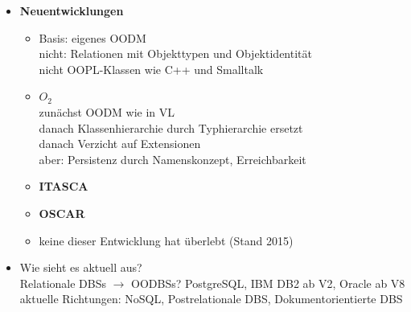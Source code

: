 \begin{itemize}
	\item \textbf{Neuentwicklungen}
	\begin{itemize}
		\item Basis: eigenes OODM\\
		nicht: Relationen mit Objekttypen und Objektidentität\\
		nicht OOPL-Klassen wie C++ und Smalltalk
		
		\item $O_2$\\
		zunächst OODM wie in VL\\
		danach Klassenhierarchie durch Typhierarchie ersetzt\\
		danach Verzicht auf Extensionen\\
		aber: Persistenz durch Namenskonzept, Erreichbarkeit
		
		\item \textbf{ITASCA}
		\item \textbf{OSCAR}
		
		\item keine dieser Entwicklung hat überlebt (Stand 2015)
	\end{itemize}
	
	\item Wie sieht es aktuell aus?\\
	Relationale DBSs $\to$ OODBSs? PostgreSQL, IBM DB2 ab V2, Oracle ab V8\\
	aktuelle Richtungen: NoSQL, Postrelationale DBS, Dokumentorientierte DBS
\end{itemize}